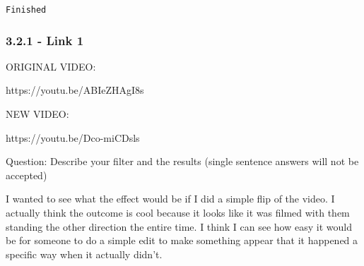 \documentclass[11pt]{article}
\begin{document}
    \begin{Verbatim}[commandchars=\\\{\}]
Finished

    \end{Verbatim}

    \subsubsection{3.2.1 - Link 1}\label{link-1}

    ORIGINAL VIDEO:

https://youtu.be/ABIeZHAgI8s

NEW VIDEO:

https://youtu.be/Dco-miCDsls

Question: Describe your filter and the results (single sentence answers
will not be accepted)

I wanted to see what the effect would be if I did a simple flip of the
video. I actually think the outcome is cool because it looks like it was
filmed with them standing the other direction the entire time. I think I
can see how easy it would be for someone to do a simple edit to make
something appear that it happened a specific way when it actually
didn't.
\end{document}
